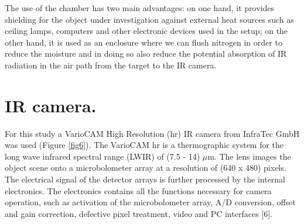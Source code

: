 		The use of the chamber has two main advantages: on one hand, it provides shielding for the object under investigation against external heat sources such as ceiling lamps, computers and other electronic devices used in the setup; on the other hand, it is used as an enclosure where we can flush nitrogen in order to reduce the moisture and in doing so also reduce the potential absorption of IR radiation in the air path from the target to the IR camera.
		
	\section{IR camera.}
	
		For this study a VarioCAM High Resolution (hr) IR camera from InfraTec GmbH was used (Figure \ref{fig6}). The VarioCAM \textregistered hr is a thermographic system for the long wave infrared spectral range (LWIR) of (7.5 - 14) $\mu$m. The lens images the object scene onto a microbolometer array at a resolution of (640 x 480) pixels. The electrical signal of the detector arrays is further processed by the internal electronics. The electronics contains all the functions necessary for camera operation, such as activation of the microbolometer array, A/D conversion, offset and gain correction, defective pixel treatment, video and PC interfaces [6].
		

